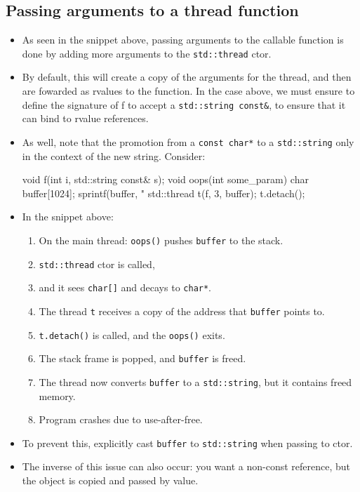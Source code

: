\documentclass[11pt, a4paper]{article}
\theoremstyle{definition}
\theoremstyle{remark}
\newcommand{\code}[1]{\lstinline|#1|}
\begin{document}
\subsection{Passing arguments to a thread function}
\begin{itemize}
    \item As seen in the snippet above, passing arguments to the callable function is done by adding more arguments to the \code{std::thread} ctor.
    \item By default, this will create a copy of the arguments for the thread, and then are fowarded as rvalues to the function. In the case above, we must ensure to define the signature of f to accept a \code{std::string const&}, to ensure that it can bind
    to rvalue references.
    \item As well, note that the promotion from a \code{const char*} to a \code{std::string} only in the context of the new string. Consider:
\begin{cppcode}
void f(int i, std::string const& s);
void oops(int some_param) {
    char buffer[1024];
    sprintf(buffer, "%
    std::thread t(f, 3, buffer);
    t.detach();
}
\end{cppcode}
    \item In the snippet above:
    \begin{enumerate}
        \item On the main thread: \code{oops()} pushes \code{buffer} to the stack.
        \item \code{std::thread} ctor is called, 
        \item and it sees \code{char[]} and decays to \code{char*}.
        \item The thread \code{t} receives a copy of the address that \code{buffer} points to.
        \item \code{t.detach()} is called, and the \code{oops()} exits.
        \item The stack frame is popped, and \code{buffer} is freed.
        \item The thread now converts \code{buffer} to a \code{std::string}, but it contains freed memory.
        \item Program crashes due to use-after-free.
    \end{enumerate}
    \item To prevent this, explicitly cast \code{buffer} to \code{std::string} when passing to ctor.
    \item The inverse of this issue can also occur: you want a non-const reference, but the object is copied and passed by value.

\end{itemize}
\end{document}
